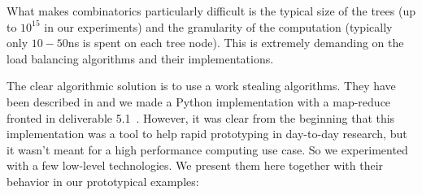 \documentclass{deliverablereport}
\begin{document}
What makes combinatorics particularly difficult is the typical size of the
trees (up to $10^{15}$ in our experiments) and the granularity of the
computation (typically only $10-50$ns is spent on each tree node). This is
extremely demanding on the load balancing algorithms and their implementations.

The clear algorithmic solution is to use a work stealing algorithms. They have
been described in \cite{10.1109/SFCS.1994.365680, BlumofeL99} and we made a
Python implementation with a map-reduce fronted in deliverable
5.1~\cite{map-reduce}. However, it was clear from the beginning that this
implementation was a tool to help rapid prototyping in day-to-day research,
but it wasn't meant for a high performance computing use case. So we experimented
with a few low-level technologies. We present them here together with their
behavior in our prototypical examples:
\end{document}
